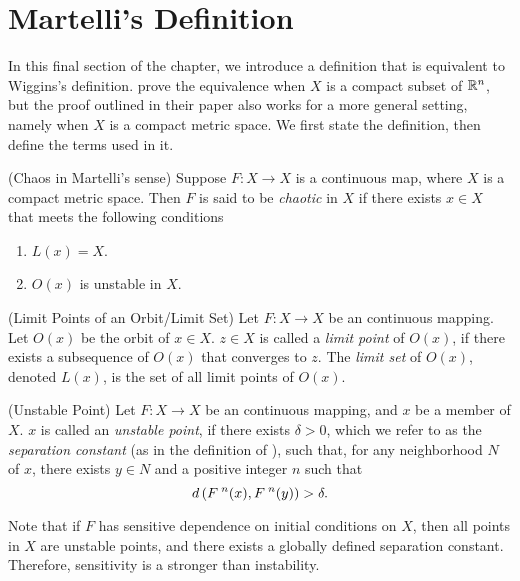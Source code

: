 \documentclass[10pt,draft,twoside]{book}
\begin{document}
\section{Martelli's Definition}
In this final section of the chapter, we introduce a definition that is equivalent to Wiggins's definition.
\citet{martelli} prove the equivalence when $X$ is a compact subset of $\mathbb{R}^n$, but the proof outlined in their paper also works for a more general setting, namely when $X$ is a compact metric space.
We first state the definition, then define the terms used in it.
\begin{definition}
  (Chaos in Martelli's sense)
  Suppose $F: X \to X$ is a continuous map, where $X$ is a compact metric space.
  Then $F$ is said to be \textit{chaotic} in $X$ if there exists $x \in X$ that meets the following conditions
  \begin{enumerate}
    \item $L(x) = X$.
    \item $O(x)$ is unstable in $X$.
  \end{enumerate}
  \label{defn:martelli}
\end{definition}
\begin{definition}
  (Limit Points of an Orbit/Limit Set)
  Let $F: X\to X$ be an continuous mapping.
  Let $O(x)$ be the orbit of $x \in X$.
  $z \in X$ is called a \textit{limit point} of $O(x)$, if there exists a subsequence of $O(x)$ that converges to $z$.
  The \textit{limit set} of $O(x)$, denoted $L(x)$, is the set of all limit points of $O(x)$.
  \label{def:limset}
\end{definition}
\begin{definition}
  (Unstable Point)
  Let $F: X\to X$ be an continuous mapping, and $x$ be a member of $X$.
  $x$ is called an \textit{unstable point}, if there exists $\delta > 0$, which we refer to as the \textit{separation constant} (as in the definition of \sdic), such that, for any neighborhood $N$ of $x$, there exists $y \in N$ and a positive integer $n$ such that 
  \begin{equation*}
    d\left( F^{\;n}(x), F^{\;n}(y) \right) > \delta.
  \end{equation*}
  \label{defn:unstable-orbit}
\end{definition}
Note that if $F$ has sensitive dependence on initial conditions on $X$, then all points in $X$ are unstable points, and there exists a globally defined separation constant.
Therefore, sensitivity is a stronger than instability.
\end{document}
